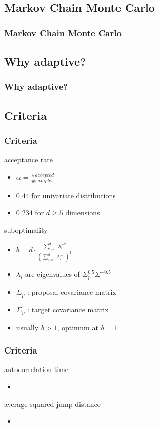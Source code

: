 

\subsection{Markov Chain Monte Carlo}
\begin{frame}
\frametitle{Markov Chain Monte Carlo}

\end{frame}


\subsection{Why adaptive?}
\begin{frame}
\frametitle{Why adaptive?}

\end{frame}


\subsection{Criteria}
\begin{frame}
\frametitle{Criteria}
\begin{block}{acceptance rate}
\begin{itemize}
  \item $\alpha = \frac{\# accepted}{\# samples}$
  \item $0.44$ for univariate distributions
  \item $0.234$ for $d\geq 5$ dimensions
\end{itemize}

\end{block}
\begin{block}{suboptimality}
\begin{itemize}
  \item $b = d\cdot \frac{\sum_{i=1}^d \lambda_i^{-2}}{(\sum_{i=1}^d
  \lambda_i^{-1})^2}$
  \item $\lambda_i$ are eigenvalues of $\Sigma_p^{0.5}\Sigma^{-0.5}$
  \item $\Sigma_p$ : proposal covariance matrix
  \item $\Sigma_p$ : target covariance matrix
  \item usually $b>1$, optimum at $b=1$
\end{itemize}

\end{block}
\end{frame}

\begin{frame}
\frametitle{Criteria}
\begin{block}{autocorrelation time}
\begin{itemize}
  \item 
\end{itemize}

\end{block}
\begin{block}{average squared jump distance}
\begin{itemize}
  \item 
\end{itemize}

\end{block}
\end{frame}